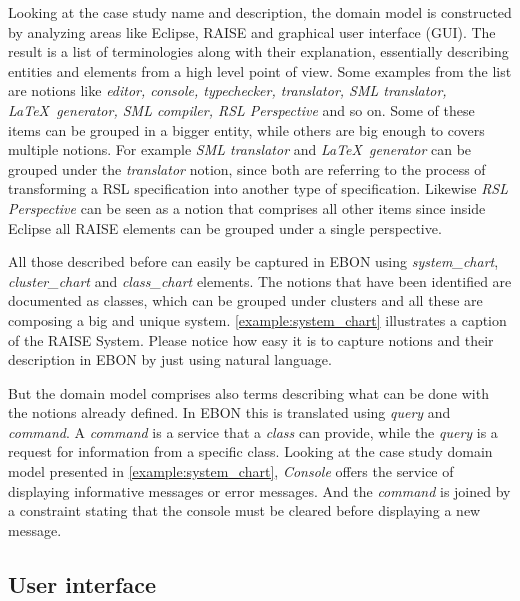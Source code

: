 \documentclass[conference]{IEEEtran}
\begin{document}
Looking at the case study name and description, the domain model is
constructed by analyzing areas like Eclipse, RAISE and graphical user
interface (GUI). The result is a list of terminologies along with
their explanation, essentially describing entities and elements from a
high level point of view. Some examples from the list are notions
like \emph{editor, console, typechecker, translator, SML translator,
\LaTeX\ generator, SML compiler, RSL Perspective} and so on. Some of
these items can be grouped in a bigger entity, while others are
big enough to covers multiple notions. For example \emph{SML translator}
and \emph{\LaTeX\ generator} can be grouped under the
\emph{translator} notion, since both are referring to the process of
transforming a RSL specification into another type of specification.
Likewise \emph{RSL Perspective} can be seen as a notion that comprises
all other items since inside Eclipse all RAISE elements can be grouped
under a single perspective.



All those described before can easily be captured in EBON using
\emph{system\_chart}, \emph{cluster\_chart} and \emph{class\_chart}
elements. The notions that have been identified are documented as
classes, which can be grouped under clusters and all these are
composing a big and unique system. \autoref{example:system_chart}
illustrates a caption of the RAISE System. Please notice how easy it
is to capture notions and their description in EBON by just using
natural language.

But the domain model comprises also terms describing what can be
done with the notions already defined. In EBON this is
translated using \emph{query} and \emph{command}. A
\emph{command} is a service that a \emph{class} can provide,
while the \emph{query} is a request for information from a
specific class. Looking at the case study domain model presented
in \autoref{example:system_chart}, \emph{Console} offers the
service of displaying informative messages or error messages.
And the \emph{command} is joined by a constraint stating that
the console must be cleared before displaying a new message.

%
\subsection{User interface}
\label{sec:user-interface}
\end{document}
